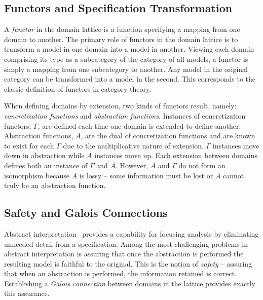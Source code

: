 \documentclass[12pt]{article}
\begin{document}
\subsection{Functors and Specification Transformation}

A \emph{functor} in the domain lattice is a function specifying a
mapping from one domain to another.  The primary role of functors in
the domain lattice is to transform a model in one domain into a model
in another.  Viewing each domain comprising its type as a subcategory
of the category of all models, a functor is simply a mapping from one
subcategory to another.  Any model in the original category can be
transformed into a model in the second.  This corresponds to the
classic definition of functors in category theory.


When defining domains by extension, two kinds of functors result,
namely: \emph{concretization functions} and \emph{abstraction
  functions}.  Instances of concretization functors, $\Gamma$, are
defined each time one domain is extended to define another.
Abstraction functions, $A$, are the dual of concretization functions
and are known to exist for each $\Gamma$ due to the multiplicative
nature of extension.  $\Gamma$ instances move down in abstraction
while $A$ instances move up.  Each extension between domains defines
both an instance of $\Gamma$ and $A$.  However, $A$ and $\Gamma$ do
not form an isomorphism because $A$ is lossy -- some information must
be lost or $A$ cannot truly be an abstraction function.

\subsection{Safety and Galois Connections}

Abstract interpretation~\cite{Cousot:00:Abstract-Interp} provides a
capability for focusing analysis by eliminating unneeded detail from a
specification.  Among the most challenging problems in abstract
interpretation is assuring that once the abstraction is performed the
resulting model is faithful to the original. This is the notion of
\emph{safety} -- assuring that when an abstraction is performed, the
information retained is correct.  Establishing a \emph{Galois
  connection} \cite{Nielson:05:Principles-of-P} between domains in the
lattice provides exactly this assurance.
\end{document}
